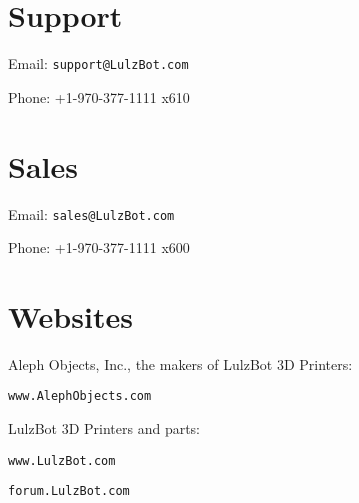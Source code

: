 %
%
%
%
%

\section{Support}
\setlength{\parindent}{0pt}
Email: \texttt{support@LulzBot.com}

Phone: +1-970-377-1111 x610

\section{Sales}

Email: \texttt{sales@LulzBot.com}

Phone: +1-970-377-1111 x600

\section{Websites}

Aleph Objects, Inc., the makers of LulzBot 3D Printers:

\texttt{www.AlephObjects.com}


LulzBot 3D Printers and parts:

\texttt{www.LulzBot.com}

\texttt{forum.LulzBot.com}
